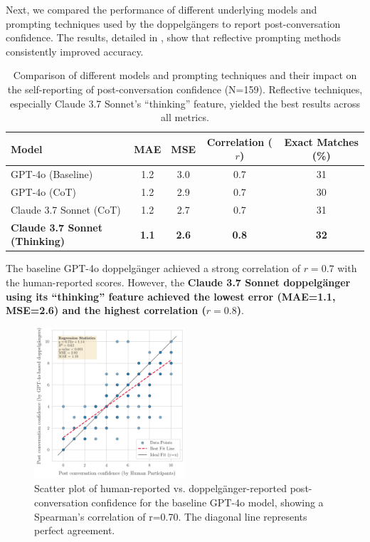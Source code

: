 Next, we compared the performance of different underlying models and prompting
techniques used by the doppelgängers to report post-conversation confidence. The
results, detailed in , show that reflective prompting
methods consistently improved accuracy.

\begin{table}[!ht]
	\centering
	\begin{tabular}{l|cccc}
		\toprule
		\textbf{Model}                        & \textbf{MAE} & \textbf{MSE} & \textbf{Correlation ($r$)} & \textbf{Exact Matches (\%)} \\
		\midrule
		GPT-4o (Baseline)                     & 1.2          & 3.0          & 0.7                        & 31
		\\
		GPT-4o (CoT)                          & 1.2          & 2.9          & 0.7                        & 30                          \\
		Claude 3.7 Sonnet (CoT)               & 1.2          & 2.7          & 0.7                        & 31                          \\
		\textbf{Claude 3.7 Sonnet (Thinking)} & \textbf{1.1} & \textbf{2.6} & \textbf{0.8}               & \textbf{32}                 \\
		\bottomrule
	\end{tabular}
	\caption[Effect of LLM type and reasoning on synthetic smokers' self-reported confidence.]{Comparison of different models and prompting techniques and their impact on the self-reporting of post-conversation confidence (N=159). Reflective techniques, especially Claude 3.7 Sonnet's ``thinking'' feature, yielded the best results across all metrics.}
	\label{tab:model_comparison}
\end{table}

The baseline GPT-4o doppelgänger achieved a strong correlation of \textbf{$r=0.7$} with
the human-reported scores. However, the \textbf{Claude 3.7 Sonnet doppelgänger using
	its ``thinking'' feature achieved the lowest error (MAE=1.1, MSE=2.6) and the highest
	correlation ($r=0.8$)}.

\begin{figure}[htpb]
	\centering
	\includegraphics[width=0.5\textwidth]{fig/post_conf_gpt4o_vs_human.png}
	\caption{Scatter plot of human-reported vs. doppelgänger-reported post-conversation confidence for the baseline GPT-4o model, showing a Spearman's correlation of r=0.70. The diagonal line represents perfect agreement.}
	\label{fig:post-conf-gpt4o-vs-human}
\end{figure}

